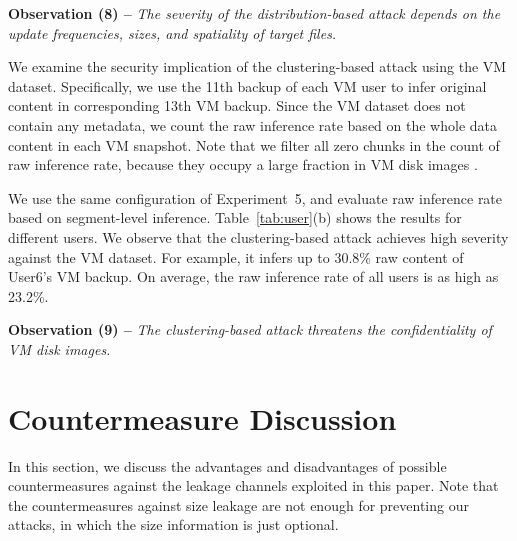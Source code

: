 \documentclass[bachelor]{thesis-uestc}
\begin{document}
{\bf Observation (8) --} {\em The severity of the distribution-based attack depends on the update frequencies, sizes, and spatiality of target files. } 

We examine the security implication of the clustering-based attack using the
VM dataset. Specifically, we use the 11th  backup of each VM user  to infer original content in corresponding 13th VM
backup. Since the VM dataset does not contain any metadata, we count the raw
inference rate based on the  whole data content in each VM snapshot.
Note that we filter all zero chunks in the count of raw inference rate,
because they occupy a large fraction in VM disk images \cite{jin09}.           



We use the same configuration of Experiment~5, and evaluate raw inference rate
based on segment-level inference.  Table~\ref{tab:user}(b) shows the results
for different users.  We observe that the clustering-based attack achieves high
severity against the VM dataset. For example, it infers up to 30.8\% raw
content of User6's VM backup. On average, the raw inference rate of all users
is as high as 23.2\%.  

{\bf Observation (9) --} {\em The clustering-based attack threatens the
confidentiality of VM disk images. } 

\chapter{Countermeasure Discussion}
\label{sec:countermeasure}

In this section, we discuss the advantages and disadvantages of possible countermeasures against the leakage channels exploited in this paper. Note that the countermeasures against size leakage are not enough for preventing our attacks, in which the size information is just optional.  
\end{document}
